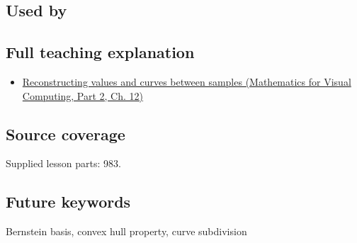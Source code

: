 \subsection{Used by}\label{appendix-ddbec701898c-used-by}

\hypertarget{appendix-ddbec701898c-used-by}{}

\subsection{Full teaching explanation}\label{appendix-ddbec701898c-full-teaching-explanation}

\hypertarget{appendix-ddbec701898c-full-teaching-explanation}{}

\begin{itemize}
\tightlist
\item
  \href{../02-Mathematics-for-Visual-Computing-P02/main.pdf\#nameddest=02-foundations-ii-ch028-reconstructing-values-and-curves-between-samples}{Reconstructing values and curves between samples (Mathematics for Visual Computing, Part 2, Ch. 12)}
\end{itemize}

\subsection{Source coverage}\label{appendix-ddbec701898c-source-coverage}

\hypertarget{appendix-ddbec701898c-source-coverage}{}

Supplied lesson parts: 983.

\subsection{Future keywords}\label{appendix-ddbec701898c-future-keywords}

\hypertarget{appendix-ddbec701898c-future-keywords}{}

Bernstein basis, convex hull property, curve subdivision
